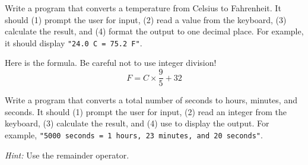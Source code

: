 

\begin{exercise}  %

Write a program that converts a temperature from Celsius to Fahrenheit.
It should (1) prompt the user for input, (2) read a  value from the keyboard, (3) calculate the result, and (4) format the output to one decimal place.
For example, it should display {\tt "24.0 C = 75.2 F"}.

Here is the formula.
Be careful not to use integer division!
%
\[ F = C \times \frac{9}{5} + 32 \]

\end{exercise}


\begin{exercise}  %

Write a program that converts a total number of seconds to hours, minutes, and seconds.
It should (1) prompt the user for input, (2) read an integer from the keyboard, (3) calculate the result, and (4) use  to display the output.
For example, {\tt "5000 seconds = 1 hours, 23 minutes, and 20 seconds"}.

{\it Hint:} Use the remainder operator.

\end{exercise}


